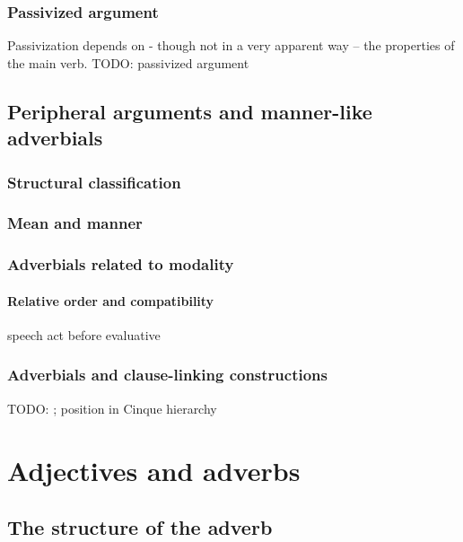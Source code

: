 \documentclass[UTF8, a4paper, oneside, scheme=plain, 12pt]{ctexbook}
\newcommand*{\citesec}[1]{\S~{#1}}
\newcommand*{\citechap}[1]{Ch.~{#1}}
\newcommand*{\citepage}[1]{p.~{#1}}
\begin{document}
\subsection{Passivized argument}

Passivization depends on - though not in a very apparent way -- the properties of the main verb. 
TODO: passivized argument

\section{Peripheral arguments and manner-like adverbials}\label{sec:vp.peripheral}

\subsection{Structural classification}

\subsection{Mean and manner}

\subsection{Adverbials related to modality}


\subsubsection{Relative order and compatibility}

speech act before evaluative \citep[\citepage{106}]{cinque1999adverbs}

\subsection{Adverbials and clause-linking constructions}

TODO: \citet[\citechap{8}, \citesec{12}]{cgel}; position in Cinque hierarchy

\chapter{Adjectives and adverbs}

\section{The structure of the adverb}
\end{document}

